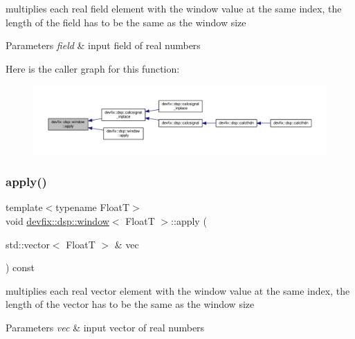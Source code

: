 multiplies each real field element with the window value at the same index, the length of the field has to be the same as the window size 


\begin{DoxyParams}{Parameters}
{\em field} & input field of real numbers \\
\hline
\end{DoxyParams}
Here is the caller graph for this function\+:
\nopagebreak
\begin{figure}[H]
\begin{center}
\leavevmode
\includegraphics[width=350pt]{structdevfix_1_1dsp_1_1window_aebc5f8902372df2cb349e009660f6752_icgraph}
\end{center}
\end{figure}
\mbox{\label{structdevfix_1_1dsp_1_1window_ac048886c4ae01a95d5272cbf73eac542}} 
\subsubsection{\texorpdfstring{apply()}{apply()}\hspace{0.1cm}{\footnotesize\ttfamily [2/6]}}
{\footnotesize\ttfamily template$<$typename FloatT$>$ \\
void \hyperlink{structdevfix_1_1dsp_1_1window}{devfix\+::dsp\+::window}$<$ FloatT $>$\+::apply (\begin{DoxyParamCaption}\item[{std\+::vector$<$ FloatT $>$ \&}]{vec }\end{DoxyParamCaption}) const\hspace{0.3cm}{\ttfamily [inline]}}



multiplies each real vector element with the window value at the same index, the length of the vector has to be the same as the window size 


\begin{DoxyParams}{Parameters}
{\em vec} & input vector of real numbers \\
\hline
\end{DoxyParams}
\mbox{\label{structdevfix_1_1dsp_1_1window_a3c9dc67499f51b6a70657fd71be5faa3}} 
